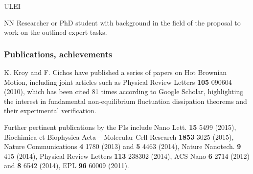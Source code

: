 \begin{sitedescription}{ULEI}
\begin{participant}[type=res,PM=36,salary=5500]{NN}
Researcher or PhD student with background in the field of the proposal to work on the outlined expert tasks.
\end{participant}

\subsubsection*{Publications, achievements}

\begin{compactenum}
\item K. Kroy and F. Cichos have published a series of papers on Hot Brownian Motion, including joint articles such as 
Physical Review Letters {\bf 105} 090604 (2010), which has been cited 81 times according to Google Scholar, 
highlighting the interest in fundamental non-equilibrium fluctuation dissipation theorems and their experimental verification.

\item Further pertinent publications by the PIs include Nano Lett. {\bf 15} 5499 (2015), 
Biochimica et Biophysica Acta -- Molecular Cell Research {\bf 1853} 3025 (2015),
Nature Communications {\bf 4} 1780 (2013) and {\bf 5} 4463 (2014),
Nature Nanotech. {\bf 9} 415 (2014), Physical Review Letters {\bf 113} 238302 (2014), 
ACS Nano {\bf 6} 2714 (2012) and {\bf 8} 6542 (2014), EPL {\bf 96} 60009 (2011).







\end{compactenum}
\end{sitedescription}
